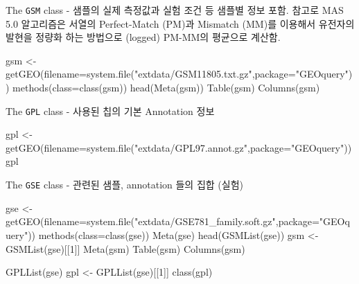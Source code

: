 \documentclass[
]{book}
\newenvironment{Shaded}{\begin{snugshade}}{\end{snugshade}}
\newcommand{\AttributeTok}[1]{\textcolor[rgb]{0.77,0.63,0.00}{#1}}
\newcommand{\DecValTok}[1]{\textcolor[rgb]{0.00,0.00,0.81}{#1}}
\newcommand{\FunctionTok}[1]{\textcolor[rgb]{0.00,0.00,0.00}{#1}}
\newcommand{\NormalTok}[1]{#1}
\newcommand{\OtherTok}[1]{\textcolor[rgb]{0.56,0.35,0.01}{#1}}
\newcommand{\StringTok}[1]{\textcolor[rgb]{0.31,0.60,0.02}{#1}}
\begin{document}
The \texttt{GSM} class - 샘플의 실제 측정값과 실험 조건 등 샘플별 정보 포함. 참고로 MAS 5.0 알고리즘은 서열의 Perfect-Match (PM)과 Mismatch (MM)를 이용해서 유전자의 발현을 정량화 하는 방법으로 (logged) PM-MM의 평균으로 계산함.

\begin{Shaded}
\begin{Highlighting}[]
\NormalTok{gsm }\OtherTok{\textless{}{-}} \FunctionTok{getGEO}\NormalTok{(}\AttributeTok{filename=}\FunctionTok{system.file}\NormalTok{(}\StringTok{"extdata/GSM11805.txt.gz"}\NormalTok{,}\AttributeTok{package=}\StringTok{"GEOquery"}\NormalTok{))}
\FunctionTok{methods}\NormalTok{(}\AttributeTok{class=}\FunctionTok{class}\NormalTok{(gsm))}
\FunctionTok{head}\NormalTok{(}\FunctionTok{Meta}\NormalTok{(gsm))}
\FunctionTok{Table}\NormalTok{(gsm)}
\FunctionTok{Columns}\NormalTok{(gsm)}
\end{Highlighting}
\end{Shaded}

The \texttt{GPL} class - 사용된 칩의 기본 Annotation 정보

\begin{Shaded}
\begin{Highlighting}[]
\NormalTok{gpl }\OtherTok{\textless{}{-}} \FunctionTok{getGEO}\NormalTok{(}\AttributeTok{filename=}\FunctionTok{system.file}\NormalTok{(}\StringTok{"extdata/GPL97.annot.gz"}\NormalTok{,}\AttributeTok{package=}\StringTok{"GEOquery"}\NormalTok{))}
\NormalTok{gpl}
\end{Highlighting}
\end{Shaded}

The \texttt{GSE} class - 관련된 샘플, annotation 들의 집합 (실험)

\begin{Shaded}
\begin{Highlighting}[]
\NormalTok{gse }\OtherTok{\textless{}{-}} \FunctionTok{getGEO}\NormalTok{(}\AttributeTok{filename=}\FunctionTok{system.file}\NormalTok{(}\StringTok{"extdata/GSE781\_family.soft.gz"}\NormalTok{,}\AttributeTok{package=}\StringTok{"GEOquery"}\NormalTok{))}
\FunctionTok{methods}\NormalTok{(}\AttributeTok{class=}\FunctionTok{class}\NormalTok{(gse))}
\FunctionTok{Meta}\NormalTok{(gse)}
\FunctionTok{head}\NormalTok{(}\FunctionTok{GSMList}\NormalTok{(gse))}
\NormalTok{gsm }\OtherTok{\textless{}{-}} \FunctionTok{GSMList}\NormalTok{(gse)[[}\DecValTok{1}\NormalTok{]]}
\FunctionTok{Meta}\NormalTok{(gsm)}
\FunctionTok{Table}\NormalTok{(gsm)}
\FunctionTok{Columns}\NormalTok{(gsm)}


\FunctionTok{GPLList}\NormalTok{(gse)}
\NormalTok{gpl }\OtherTok{\textless{}{-}} \FunctionTok{GPLList}\NormalTok{(gse)[[}\DecValTok{1}\NormalTok{]]}
\FunctionTok{class}\NormalTok{(gpl)}
\end{Highlighting}
\end{Shaded}
\end{document}
